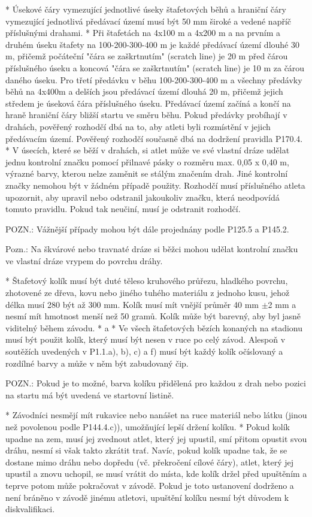 * Úsekové čáry vymezující jednotlivé úseky štafetových běhů a hraniční čáry vymezující jednotlivá předávací území musí být  50 mm široké a vedené napříč příslušnými drahami.
* Při štafetách na 4x100 m a 4x200 m a na prvním a druhém úseku štafety na 100-200-300-400 m je každé předávací území dlouhé 30 m, přičemž počáteční "čára se zaškrtnutím" (scratch line) je 20 m před čárou příslušného úseku a koncová "čára se zaškrtnutím" (scratch line) je 10 m za čárou daného úseku. Pro třetí předávku v běhu 100-200-300-400 m a všechny předávky běhů na 4x400m a delších jsou předávací území dlouhá 20 m, přičemž jejich středem je úseková čára příslušného úseku. Předávací území začíná a končí na hraně hraniční čáry bližší startu ve směru běhu. Pokud předávky probíhají v drahách, pověřený rozhodčí dbá na to, aby atleti byli rozmístění v jejich předávacím území. Pověřený rozhodčí současně dbá na dodržení pravidla P170.4.
* V úsecích, které se běží v drahách, si atlet může ve své vlastní dráze udělat jednu kontrolní značku pomocí přilnavé pásky o rozměru max. 0,05 x 0,40 m, výrazné barvy, kterou nelze zaměnit se stálým značením drah. Jiné kontrolní značky nemohou být v žádném případě použity. Rozhodčí musí příslušného atleta upozornit, aby upravil nebo odstranil jakoukoliv značku, která neodpovídá tomuto pravidlu. Pokud tak neučiní, musí je odstranit rozhodčí.

POZN.: Vážnější případy mohou být dále projednány podle P125.5 a P145.2.

Pozn.: Na škvárové nebo travnaté dráze si běžci mohou udělat kontrolní značku ve vlastní dráze vrypem do povrchu dráhy.

* Štafetový kolík musí být duté těleso kruhového průřezu, hladkého povrchu, zhotovené ze dřeva, kovu nebo jiného tuhého materiálu z jednoho kusu, jehož délka musí 280 být až 300 mm. Kolík musí mít vnější průměr 40 mm $\pm$2 mm a nesmí mít hmotnost menší než 50 gramů. Kolík může být barevný, aby byl jasně viditelný během závodu.
* \begitems \style a
  * Ve všech štafetových bězích konaných na stadionu musí být použit kolík, který musí být nesen v ruce po celý závod. Alespoň v soutěžích uvedených v P1.1.a), b), c) a f) musí být každý kolík očíslovaný a rozdílné barvy a může v něm být zabudovaný čip.

  POZN.: Pokud je to možné, barva kolíku přidělená pro každou z drah nebo pozici na startu má být uvedená ve startovní listině.

  * Závodníci nesmějí mít rukavice nebo nanášet na ruce materiál nebo látku (jinou než povolenou podle P144.4.c)), umožňující lepší držení kolíku.
  * Pokud kolík upadne na zem, musí jej zvednout atlet, který jej upustil, smí přitom opustit svou dráhu, nesmí si však takto zkrátit trať. Navíc, pokud kolík upadne tak, že se dostane mimo dráhu nebo dopředu (vč. překročení cílové čáry), atlet, který jej upustil a znovu uchopil, se musí vrátit do místa, kde kolík držel před upuštěním a teprve potom může pokračovat v závodě. Pokud je toto ustanovení dodrženo a není bráněno v závodě jinému atletovi, upuštění kolíku nesmí být důvodem k diskvalifikaci.
  \enditems


